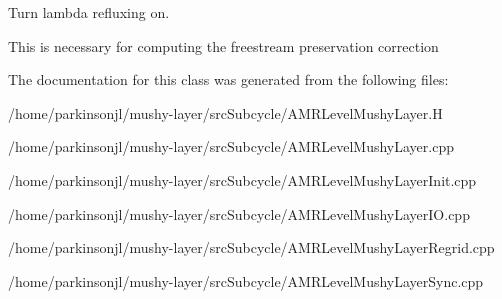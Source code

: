 Turn lambda refluxing on. 

This is necessary for computing the freestream preservation correction 

The documentation for this class was generated from the following files\-:\begin{DoxyCompactItemize}
\item 
/home/parkinsonjl/mushy-\/layer/src\-Subcycle/A\-M\-R\-Level\-Mushy\-Layer.\-H\item 
/home/parkinsonjl/mushy-\/layer/src\-Subcycle/A\-M\-R\-Level\-Mushy\-Layer.\-cpp\item 
/home/parkinsonjl/mushy-\/layer/src\-Subcycle/A\-M\-R\-Level\-Mushy\-Layer\-Init.\-cpp\item 
/home/parkinsonjl/mushy-\/layer/src\-Subcycle/A\-M\-R\-Level\-Mushy\-Layer\-I\-O.\-cpp\item 
/home/parkinsonjl/mushy-\/layer/src\-Subcycle/A\-M\-R\-Level\-Mushy\-Layer\-Regrid.\-cpp\item 
/home/parkinsonjl/mushy-\/layer/src\-Subcycle/A\-M\-R\-Level\-Mushy\-Layer\-Sync.\-cpp\end{DoxyCompactItemize}
